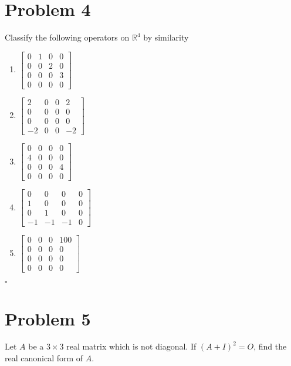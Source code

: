 \documentclass[11pt]{article}
\newcommand{\R}{\mathbb{R}}
\newenvironment{proof}{\noindent{\bf Proof.}}{\hfill $\square$\medskip}
\begin{document}
\section{Problem 4}
Classify the following operators on $\R^{4}$ by similarity
\begin{enumerate}[label=(\alph*)]
  \item $\begin{bmatrix}
    0&1&0&0\\
    0&0&2&0\\
    0&0&0&3\\
    0&0&0&0
  \end{bmatrix}$
  \item $\begin{bmatrix}
    2&0&0&2\\
    0&0&0&0\\
    0&0&0&0\\
    -2&0&0&-2
  \end{bmatrix}$
  \item $\begin{bmatrix}
    0&0&0&0\\
    4&0&0&0\\
    0&0&0&4\\
    0&0&0&0
  \end{bmatrix}$
  \item $\begin{bmatrix}
    0&0&0&0\\
    1&0&0&0\\
    0&1&0&0\\
    -1&-1&-1&0
  \end{bmatrix}$
  \item $\begin{bmatrix}
    0&0&0&100\\
    0&0&0&0\\
    0&0&0&0\\
    0&0&0&0
  \end{bmatrix}$
\end{enumerate}

\begin{proof}
  
\end{proof}

\section{Problem 5}
Let $A$ be a $3\times 3$ real matrix which is not diagonal. If $(A+I)^{2}=O$, find the real canonical form of $A$.
\end{document}
